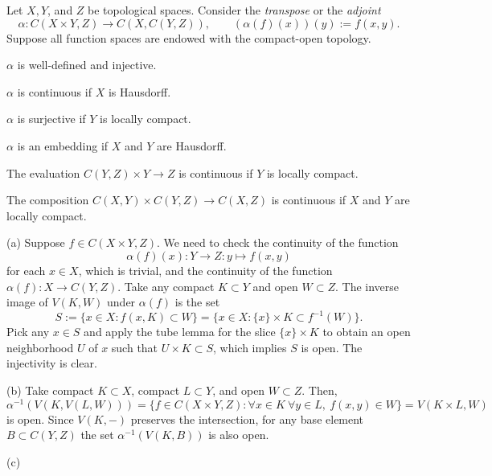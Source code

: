 \documentclass{../../large}
\begin{document}
\begin{prb}
Let $X,Y$, and $Z$ be topological spaces.
Consider the \emph{transpose} or the \emph{adjoint}
\[\alpha:C(X\times Y,Z)\to C(X,C(Y,Z)),\qquad(\alpha(f)(x))(y):=f(x,y).\]
Suppose all function spaces are endowed with the compact-open topology.
\begin{parts}
\item $\alpha$ is well-defined and injective.
\item $\alpha$ is continuous if $X$ is Hausdorff.
\item $\alpha$ is surjective if $Y$ is locally compact.
\item $\alpha$ is an embedding if $X$ and $Y$ are Hausdorff.
\item The evaluation $C(Y,Z)\times Y\to Z$ is continuous if $Y$ is locally compact.
\item The composition $C(X,Y)\times C(Y,Z)\to C(X,Z)$ is continuous if $X$ and $Y$ are locally compact.
\end{parts}
\end{prb}
\begin{pf}
(a)
Suppose $f\in C(X\times Y,Z)$.
We need to check the continuity of the function
\[\alpha(f)(x):Y\to Z:y\mapsto f(x,y)\]
for each $x\in X$, which is trivial, and the continuity of the function $\alpha(f):X\to C(Y,Z)$.
Take any compact $K\subset Y$ and open $W\subset Z$.
The inverse image of $V(K,W)$ under $\alpha(f)$ is the set
\[S:=\{x\in X:f(x,K)\subset W\}=\{x\in X:\{x\}\times K\subset f^{-1}(W)\}.\]
Pick any $x\in S$ and apply the tube lemma for the slice $\{x\}\times K$ to obtain an open neighborhood $U$ of $x$ such that $U\times K\subset S$, which implies $S$ is open.
The injectivity is clear.

(b)
Take compact $K\subset X$, compact $L\subset Y$, and open $W\subset Z$.
Then,
\[\alpha^{-1}(V(K,V(L,W)))=\{f\in C(X\times Y,Z):\forall x\in K\ \forall y\in L,\ f(x,y)\in W\}=V(K\times L,W)\]
is open.
Since $V(K,-)$ preserves the intersection, for any base element $B\subset C(Y,Z)$ the set $\alpha^{-1}(V(K,B))$ is also open.

(c)

\end{pf}
\end{document}
